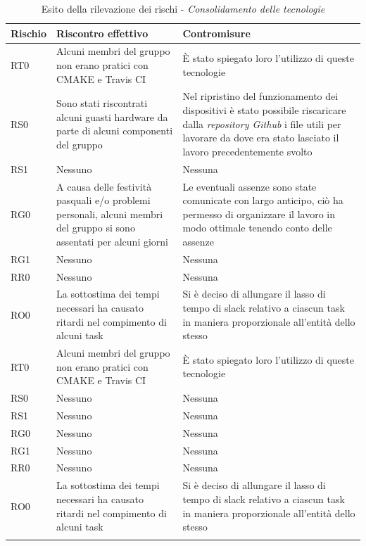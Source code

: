 \documentclass[./PianodiProgetto.tex]{subfiles}
\begin{document}
\begin{longtable}{|p{15mm}|p{60mm}|p{60mm}|}
	\hline \textbf{Rischio} & \textbf{Riscontro effettivo} & \textbf{Contromisure} \\
	
	\hline RT0 & Alcuni membri del gruppo non erano pratici con CMAKE e Travis CI &  È stato spiegato loro l'utilizzo di queste tecnologie \\
	
	\hline RS0 & Sono stati riscontrati alcuni guasti hardware da parte di alcuni componenti del gruppo & Nel ripristino del funzionamento dei dispositivi è stato possibile riscaricare dalla \textit{repository Github} i file utili per lavorare da dove era stato lasciato il lavoro precedentemente svolto \\
	
	\hline RS1 & Nessuno & Nessuna \\
	
	\hline RG0 & A causa delle festività pasquali e/o problemi personali, alcuni membri del gruppo si sono assentati per alcuni giorni & Le eventuali assenze sono state comunicate con largo anticipo, ciò ha permesso di organizzare il lavoro in modo ottimale tenendo conto delle assenze \\
	
	\hline RG1 & Nessuno & Nessuna \\
	
	\hline RR0 & Nessuno & Nessuna \\
	
	\hline RO0 & La sottostima dei tempi necessari ha causato ritardi nel compimento di alcuni task & Si è deciso di allungare il lasso di tempo di slack relativo a ciascun task in maniera proporzionale all'entità dello stesso \\

	\hline RT0 & Alcuni membri del gruppo non erano pratici con CMAKE e Travis CI &  È stato spiegato loro l'utilizzo di queste tecnologie \\
	
	\hline RS0 & Nessuno & Nessuna \\
	
	\hline RS1 & Nessuno & Nessuna \\
	
	\hline RG0 & Nessuno & Nessuna \\
	
	\hline RG1 & Nessuno & Nessuna \\
	
	\hline RR0 & Nessuno & Nessuna \\
	
	\hline RO0 & La sottostima dei tempi necessari ha causato ritardi nel compimento di alcuni task & Si è deciso di allungare il lasso di tempo di slack relativo a ciascun task in maniera proporzionale all'entità dello stesso \\
	
	\hline
	\caption{Esito della rilevazione dei rischi - \textit{Consolidamento delle tecnologie}}
\end{longtable}
\end{document}
